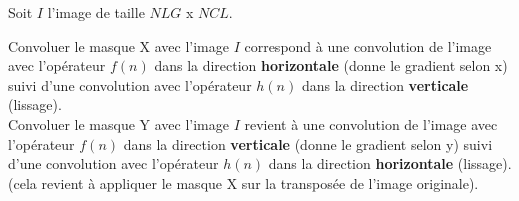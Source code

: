 Soit $ I $ l'image de taille $ NLG $ x $ NCL $.

Convoluer le masque X avec l'image $ I $ correspond à une convolution de l'image avec l'opérateur $ f(n) $ dans la direction \textbf{horizontale} (donne le gradient selon x) suivi d'une convolution avec l'opérateur $ h(n) $ dans la direction \textbf{verticale} (lissage). \\

Convoluer le masque Y avec l'image $ I $ revient à une convolution de l'image avec l'opérateur $ f(n) $ dans la direction \textbf{verticale} (donne le gradient selon y) suivi d'une convolution avec l'opérateur $ h(n) $ dans la direction \textbf{horizontale} (lissage). (cela revient à appliquer le masque X sur la transposée de l'image originale).

